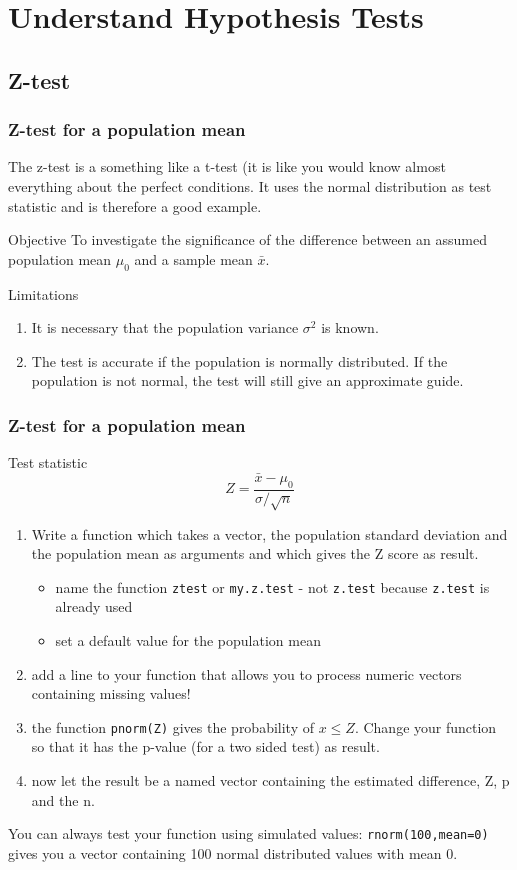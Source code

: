 \documentclass[xcolor={table}]{beamer}
\begin{document}
\section{Understand Hypothesis Tests}\small 
\subsection{Z-test}
\begin{frame}\frametitle{Z-test for a population mean} 
The z-test is a something like a t-test (it is like you would know almost everything about the perfect conditions. It uses the normal distribution as test statistic and is therefore a good example.
  \begin{block}{Objective}
    To investigate the significance of the difference between an assumed population mean $\mu_0$ and a sample mean $\bar{x}$.
  \end{block}
  \begin{alertblock}{Limitations}
    \begin{enumerate}
      \item It is necessary that the population variance $\sigma^2$ is known. 
      \item The test is accurate if the population is normally distributed. If the population is not normal, the test will still give an approximate guide.
    \end{enumerate}
  \end{alertblock}
\end{frame}


\begin{frame}[fragile]\frametitle{Z-test for a population mean}\footnotesize
    \begin{exampleblock}{Test statistic}
    $$Z = \frac{\bar{x}-\mu_0}{\sigma/\sqrt{n}}$$
  \end{exampleblock}
    \begin{enumerate}
    \item Write a function which takes a vector, the population standard deviation and the population mean as arguments and which gives the Z score as result. 
      \begin{itemize}
      \item name the function \texttt{ztest} or \texttt{my.z.test} - not \texttt{z.test} because \texttt{z.test} is already used
      \item set a default value for the population mean
      \end{itemize}
    \item add a line to your function that allows you to process numeric vectors containing missing values!
    \item the function \texttt{pnorm(Z)} gives the probability of $x \leq Z $. Change your function so that it has the p-value (for a two sided test) as result. 
    \item now let the result be a named vector containing the estimated difference, Z, p and the n.
    \end{enumerate}
You can always test your function using simulated values: \texttt{rnorm(100,mean=0)} gives you a vector containing 100 normal distributed values with mean 0.
\end{frame}
\end{document}
